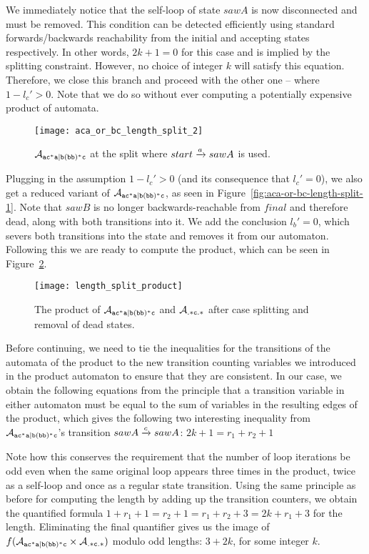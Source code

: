 \documentclass[acmsmall,review,anonymous,screen]{acmart}\settopmatter{printfolios=true,printccs=false,printacmref=true}
\theoremstyle{definition}
\begin{document}
  We immediately notice that the self-loop of state $sawA$ is now disconnected
  and must be removed. This condition can be detected efficiently using standard
  forwards/backwards reachability from the initial and accepting states
  respectively. In other words, $2k+1 = 0$ for this case and is implied by the splitting constraint. However, no choice of integer $k$  will satisfy this equation. Therefore, we close this branch and proceed with the other one -- where $1-l_c' > 0$. Note that we do so without ever computing a potentially expensive product of automata.

  \begin{figure}[h]
    \centering 
      \texttt{[image: aca\_or\_bc\_length\_split\_2]}
      \caption{$\mathcal{A}_{\mathtt{ac^*a|b(bb)^*c}}{}$ at the split where $start \xrightarrow{a} sawA$ is used.}\label{fig:aca-or-bc-length-split-2}
    \end{figure}
  
Plugging in the assumption $1-l_c' > 0$ (and its consequence that $l_c' = 0$),
we also get a reduced variant of $\mathcal{A}_{\mathtt{ac^*a|b(bb)^*c}}$, as seen in
Figure~\ref{fig:aca-or-bc-length-split-1}. Note that $sawB$ is no longer
backwards-reachable from $final$ and therefore dead, along with both transitions
into it. We add the conclusion $l_b' = 0$, which severs both transitions into
the state and removes it from our automaton. Following this we are ready to
compute the product, which can be seen in Figure~\ref{fig:length-split-product}.

\begin{figure}[h]
  \centering 
    \texttt{[image: length\_split\_product]}
    \caption{The product of $\mathcal{A}_{\mathtt{ac^*a|b(bb)^*c}}$ and $\mathcal{A}_{\mathtt{.*c.*}}$ after
    case splitting and removal of dead states.}\label{fig:length-split-product}
  \end{figure}

Before continuing, we need to tie the inequalities for the transitions of the
automata of the product to the new transition counting variables we introduced
in the product automaton to ensure that they are consistent. In our case, we obtain the following equations from the principle that a transition variable in either automaton must be equal to the sum of variables in the resulting edges of the product, which gives the following two interesting inequality from $\mathcal{A}_{\mathtt{ac^*a|b(bb)^*c}}{}$'s transition $sawA \xrightarrow{c} sawA$: $2k + 1 = r_1 + r_2 + 1$

Note how this conserves the requirement that the number of loop iterations be
odd even when the same original loop appears three times in the product, twice
as a self-loop and once as a regular state transition. Using the same principle
as before for computing the length by adding up the transition counters, we
obtain the quantified formula $1 + r_1 + 1 = r_2 + 1 = r_1 + r_2 + 3 = 2k + r_1
+ 3$ for the length. Eliminating the final quantifier gives us the image of
$f(\mathcal{A}_{\mathtt{ac^*a|b(bb)^*c}} \times \mathcal{A}_{\mathtt{.*c.*}})$ modulo odd lengths: $3 + 2k$, for some
integer $k$.
\end{document}
